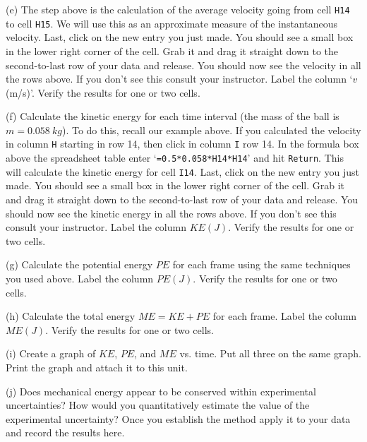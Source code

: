\vspace{2.0cm}

(e) The step above is the calculation of the average velocity going from cell {\tt H14} to cell {\tt H15}.
We will use this as an approximate measure of the instantaneous velocity.
Last, click on the new entry you just made. You should see a small box in the lower right corner of the cell.
Grab it and drag it straight down to the second-to-last row of your data and release.
You should now see the velocity in all the rows above. If you don't see this consult your instructor.
Label the column `$v$ (m/s)'.
Verify the results for one or two cells.

(f) Calculate the kinetic energy for each time interval (the mass of the ball is $m=0.058~ kg$).
To do this, recall our example above.
If you calculated the velocity in column {\tt H} starting in row 14, then
click in column {\tt I} row 14.
In the formula box above the spreadsheet table enter `{\tt =0.5*0.058*H14*H14}' and hit {\tt Return}.
This will calculate the kinetic energy for cell {\tt I14}.
Last, click on the new entry you just made. You should see a small box in the lower right corner of the cell.
Grab it and drag it straight down to the second-to-last row of your data and release.
You should now see the kinetic energy in all the rows above. If you don't see this consult your instructor.
Label the column $KE(J)$.
Verify the results for one or two cells.

(g) Calculate the potential energy $PE$ for each frame using the same techniques you used above.
Label the column $PE(J)$.
Verify the results for one or two cells.

(h) Calculate the total energy $ME = KE + PE$ for each frame.
Label the column $ME(J)$.
Verify the results for one or two cells.



(i) Create a graph of $KE$, $PE$, and $ME$ vs. time.
 Put all three on the same graph.
 Print the graph and attach it to this unit.

(j) Does mechanical energy appear
 to be conserved within experimental uncertainties? How would you quantitatively estimate
 the value of the experimental uncertainty? Once you establish the method apply it to your data
 and record the results here.

\vspace{2.5cm}

